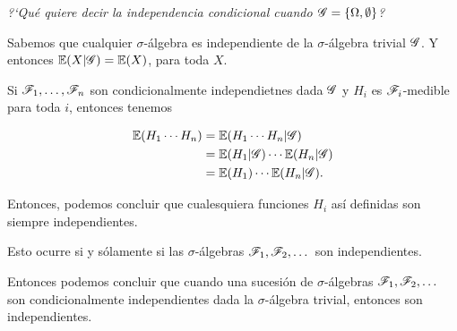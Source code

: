 ﻿\emph{
	?`Qu\'e quiere decir la independencia condicional cuando $\mathscr{G}=\left\{  \Omega ,\emptyset\right\} $?
}
\afterstatement\pn

Sabemos que cualquier $\sigma$-álgebra es
independiente de la $\sigma$-álgebra trivial $\mathscr{G}$. Y entonces $\mathbb{E}(X | \mathscr{G}) = \mathbb{E}(X)$, para toda $X$.\pn

Si $\mathscr{F}_1, \dots, \mathscr{F}_n$ son condicionalmente independietnes dada $\mathscr{G}$ y $H_i$ es $\mathscr{F}_i$-medible para toda $i$, entonces tenemos

\begin{align}
    \mathbb{E}(H_1 \cdots H_n) &=  \mathbb{E}(H_1 \cdots H_n | \mathscr{G})              \\
                        &=  \mathbb{E}(H_1 | \mathscr{G}) \cdots \mathbb{E}(H_n | \mathscr{G})    \\
                        &=  \mathbb{E}(H_1) \cdots  \mathbb{E}(H_n | \mathscr{G}).
\end{align}

Entonces, podemos concluir que cualesquiera funciones $H_i$ así definidas son siempre
independientes.\pn

Esto ocurre si y sólamente si las $\sigma$-álgebras $\mathscr{F}_1, \mathscr{F}_2,\dots$ son independientes.\pn

Entonces podemos concluir que cuando una sucesión de $\sigma$-álgebras $\mathscr{F}_1, \mathscr{F}_2,\dots$ son condicionalmente independientes
dada la $\sigma$-álgebra trivial, entonces son independientes.